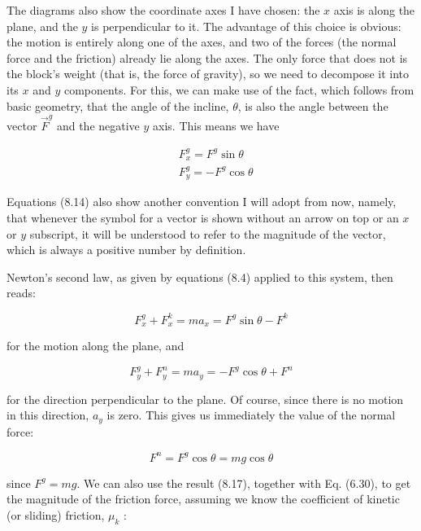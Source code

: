 \documentclass[10pt]{article}
\begin{document}
The diagrams also show the coordinate axes I have chosen: the $x$ axis is along the plane, and the $y$ is perpendicular to it. The advantage of this choice is obvious: the motion is entirely along one of the axes, and two of the forces (the normal force and the friction) already lie along the axes. The only force that does not is the block's weight (that is, the force of gravity), so we need to decompose it into its $x$ and $y$ components. For this, we can make use of the fact, which follows from basic geometry, that the angle of the incline, $\theta$, is also the angle between the vector $\vec{F}^{g}$ and the negative $y$ axis. This means we have


\begin{align*}
& F_{x}^{g}=F^{g} \sin \theta \\
& F_{y}^{g}=-F^{g} \cos \theta \tag{8.14}
\end{align*}


Equations (8.14) also show another convention I will adopt from now, namely, that whenever the symbol for a vector is shown without an arrow on top or an $x$ or $y$ subscript, it will be understood to refer to the magnitude of the vector, which is always a positive number by definition.

Newton's second law, as given by equations (8.4) applied to this system, then reads:


\begin{equation*}
F_{x}^{g}+F_{x}^{k}=m a_{x}=F^{g} \sin \theta-F^{k} \tag{8.15}
\end{equation*}


for the motion along the plane, and


\begin{equation*}
F_{y}^{g}+F_{y}^{n}=m a_{y}=-F^{g} \cos \theta+F^{n} \tag{8.16}
\end{equation*}


for the direction perpendicular to the plane. Of course, since there is no motion in this direction, $a_{y}$ is zero. This gives us immediately the value of the normal force:


\begin{equation*}
F^{n}=F^{g} \cos \theta=m g \cos \theta \tag{8.17}
\end{equation*}


since $F^{g}=m g$. We can also use the result (8.17), together with Eq. (6.30), to get the magnitude of the friction force, assuming we know the coefficient of kinetic (or sliding) friction, $\mu_{k}$ :
\end{document}
